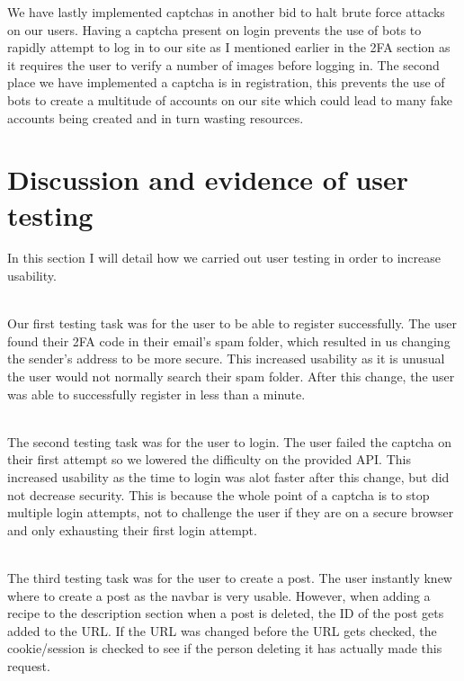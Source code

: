 \documentclass{ueacmpstyle}
\begin{document}
        We have lastly implemented captchas in another bid to halt brute force attacks on our users. Having a captcha present on login prevents the use of bots to rapidly attempt to log in to our site as I mentioned earlier in the 2FA section as it requires the user to verify a number of images before logging in. The second place we have implemented a captcha is in registration, this prevents the use of bots to create a multitude of accounts on our site which could lead to many fake accounts being created and in turn wasting resources.

        
        


    \section{Discussion and evidence of user testing}

    In this section I will detail how we carried out user testing in order to increase usability.

    \\Our first testing task was for the user to be able to register successfully.
    The user found their 2FA code in their email's spam folder, which resulted in us changing the sender's address to be more secure.
    This increased usability as it is unusual the user would not normally search their spam folder.
    After this change, the user was able to successfully register in less than a minute.

    \\The second testing task was for the user to login.
    The user failed the captcha on their first attempt so we lowered the difficulty on the provided API. This increased usability as the time to login was alot faster after this change, but did not decrease security.
    This is because the whole point of a captcha is to stop multiple login attempts, not to challenge the user if they are on a secure browser and only exhausting their first login attempt.

    \\The third testing task was for the user to create a post.
    The user instantly knew where to create a post as the navbar is very usable. However, when adding a recipe to the description section
    when a post is deleted, the ID of the post gets added to the URL. If the URL was changed before the URL gets checked, the cookie/session is checked to see if the person deleting it has actually made this request.
    
\end{document}
